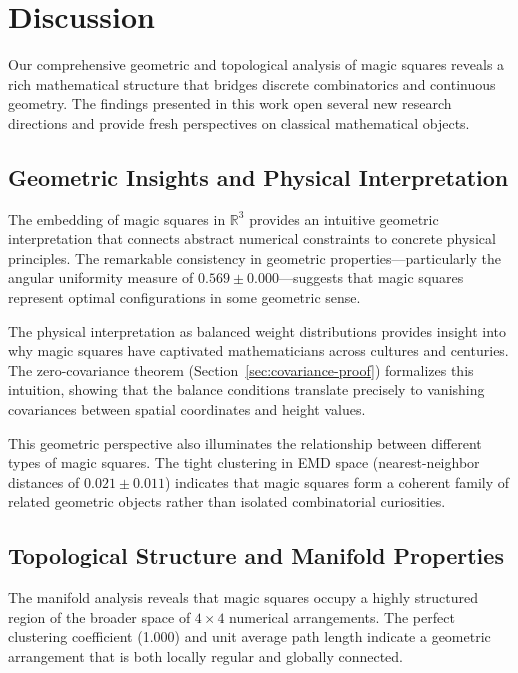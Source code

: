 \section{Discussion}\label{sec:discussion}

Our comprehensive geometric and topological analysis of magic squares reveals a rich mathematical structure that bridges discrete combinatorics and continuous geometry. The findings presented in this work open several new research directions and provide fresh perspectives on classical mathematical objects.

\subsection{Geometric Insights and Physical Interpretation}

The embedding of magic squares in $\mathbb{R}^3$ provides an intuitive geometric interpretation that connects abstract numerical constraints to concrete physical principles. The remarkable consistency in geometric properties—particularly the angular uniformity measure of $0.569 \pm 0.000$—suggests that magic squares represent optimal configurations in some geometric sense.

The physical interpretation as balanced weight distributions provides insight into why magic squares have captivated mathematicians across cultures and centuries. The zero-covariance theorem (Section~\ref{sec:covariance-proof}) formalizes this intuition, showing that the balance conditions translate precisely to vanishing covariances between spatial coordinates and height values.

This geometric perspective also illuminates the relationship between different types of magic squares. The tight clustering in EMD space (nearest-neighbor distances of $0.021 \pm 0.011$) indicates that magic squares form a coherent family of related geometric objects rather than isolated combinatorial curiosities.

\subsection{Topological Structure and Manifold Properties}

The manifold analysis reveals that magic squares occupy a highly structured region of the broader space of $4 \times 4$ numerical arrangements. The perfect clustering coefficient (1.000) and unit average path length indicate a geometric arrangement that is both locally regular and globally connected.

